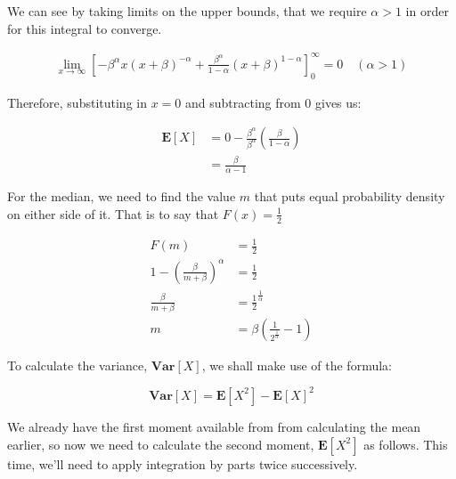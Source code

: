 \documentclass{article}
\begin{document}
We can see by taking limits on the upper bounds, that we require
$\alpha > 1$ in order for this integral to converge.

\begin{align*}
  \lim_{x \to \infty} {\left[
  - \beta^\alpha x {(x + \beta)}^{-\alpha}
  + \frac{\beta^{\alpha}}{1 - \alpha}
  {\left( x + \beta \right)}^{1 - \alpha}
  \right]}_0^{\infty} = 0
  \quad \left(  \alpha > 1 \right)
\end{align*}

Therefore, substituting in $x = 0$ and subtracting from $0$ gives us:

\begin{align*}
  \mathbf{E}\left[X\right] &= 0 - \frac{\beta^\alpha}{\beta^\alpha}
                             \left( \frac{\beta}{1 - \alpha}
                             \right) \\
                           &= \frac{\beta}{\alpha - 1}
\end{align*}

For the median, we need to find the value $m$ that puts equal
probability density on either side of it. That is to say that $F(x) =
\frac{1}{2}$

\begin{align*}
  F(m) &= \frac{1}{2} \\
  1 - {\left( \frac{\beta}{m + \beta} \right)}^{\alpha} &= \frac{1}{2} \\
  \frac{\beta}{m + \beta} &= {\frac{1}{2}}^{\frac{1}{\alpha}} \\
  m &= \beta \left( \frac{1}{2^{\frac{1}{\alpha}}} - 1 \right)
\end{align*}

To calculate the variance, $\mathbf{Var}\left[ X \right]$, we shall
make use of the formula:

\[
  \mathbf{Var}\left[ X \right] = \mathbf{E}\left[X^2\right]
  - {\mathbf{E}\left[X\right]}^2
\]

We already have the first moment available from from calculating the
mean earlier, so now we need to calculate the second moment,
$\mathbf{E}\left[X^2\right]$ as follows. This time, we'll need to
apply integration by parts twice successively.
\end{document}
